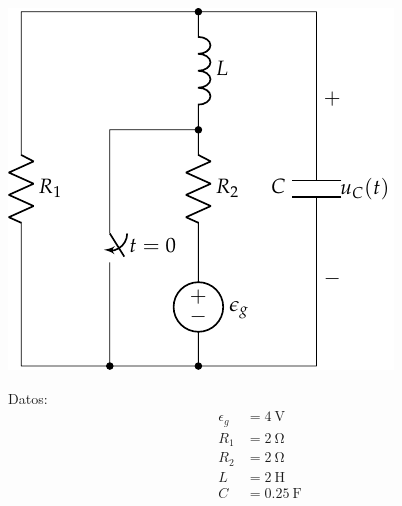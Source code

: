 \documentclass[12pt]{article}
\begin{document}
\begin{minipage}{0.7\textwidth}
  \includegraphics[scale=0.8]{figs/FM_4_9}
\end{minipage}
\hfill
\begin{minipage}{0.3\textwidth}
Datos:
\begin{align*}
  \epsilon_g &= \SI{4}{\volt}\\
  R_1 &= \SI{2}{\ohm}\\
  R_2 &= \SI{2}{\ohm}\\
  L &= \SI{2}{\henry}\\
  C &= \SI{0.25}{\farad}      
\end{align*}
\end{minipage}
\end{document}
